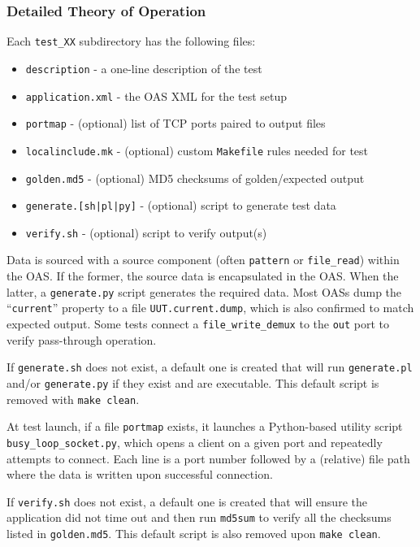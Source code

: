 \subsubsection*{Detailed Theory of Operation}
\begin{flushleft}
  Each \verb+test_XX+ subdirectory has the following files:

  \begin{itemize}{}{}
    \item \texttt{description} - a one-line description of the test
    \item \texttt{application.xml} - the OAS XML for the test setup
    \item \texttt{portmap} - (optional) list of TCP ports paired to output files
    \item \texttt{localinclude.mk} - (optional) custom \verb+Makefile+ rules needed for test
    \item \texttt{golden.md5} - (optional) MD5 checksums of golden/expected output
    \item \texttt{generate.[sh|pl|py]} - (optional) script to generate test data
    \item \texttt{verify.sh} - (optional) script to verify output(s)
  \end{itemize}

  Data is sourced with a source component (often \verb+pattern+ or \verb+file_read+) within the OAS. If the former, the source data is encapsulated in the OAS. When the latter, a \verb+generate.py+ script generates the required data. Most OASs dump the ``\texttt{current}'' property to a file \verb+UUT.current.dump+, which is also confirmed to match expected output. Some tests connect a \verb+file_write_demux+ to the \verb+out+ port to verify pass-through operation.
  \medskip

  If \texttt{generate.sh} does not exist, a default one is created that will run \texttt{generate.pl} and/or \texttt{generate.py} if they exist and are executable. This default script is removed with \verb+make clean+.
  \medskip

  At test launch, if a file \texttt{portmap} exists, it launches a Python-based utility script \verb+busy_loop_socket.py+, which opens a client on a given port and repeatedly attempts to connect. Each line is a port number followed by a (relative) file path where the data is written upon successful connection.
  \medskip

  If \texttt{verify.sh} does not exist, a default one is created that will ensure the application did not time out and then run \texttt{md5sum} to verify all the checksums listed in \texttt{golden.md5}. This default script is also removed upon \verb+make clean+.
\end{flushleft}


